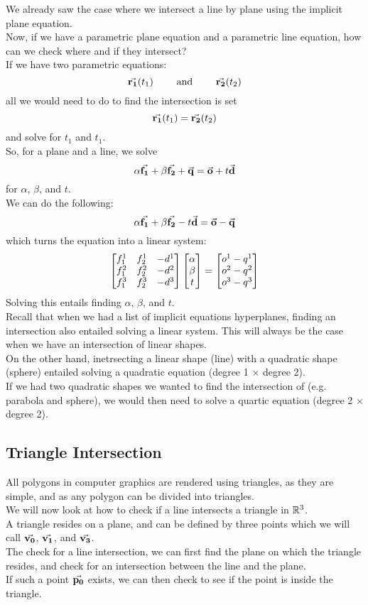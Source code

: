\documentclass[12pt]{article}
\begin{document}
We already saw the case where we intersect
a line by plane using the implicit plane
equation. \\
Now, if we have a parametric plane equation
and a parametric line equation,
how can we check where and if they intersect? \\
If we have two parametric equations:
\[ \vec{\mathbf{r_1}}(t_1) \qquad \text{ and }
\qquad \vec{\mathbf{r_2}}(t_2) \]
all we would need to do to find the intersection
is set
\[ \vec{\mathbf{r_1}}(t_1) = \vec{\mathbf{r_2}}(t_2) \]
and solve for $t_1$ and $t_1$. \\
So, for a plane and a line, we solve
\[ \alpha \vec{\mathbf{f_1}} + \beta \vec{\mathbf{f_2}} + \vec{\mathbf{q}}
= \vec{\mathbf{o}} + t\vec{\mathbf{d}} \]
for $\alpha$, $\beta$, and $t$. \\
We can do the following:
\[ \alpha \vec{\mathbf{f_1}} + \beta \vec{\mathbf{f_2}} - t\vec{\mathbf{d}}
= \vec{\mathbf{o}} - \vec{\mathbf{q}} \]
which turns the equation into a linear system:
\[ 
    \begin{bmatrix} f_1^1 & f_2^1 & -d^1 \\ f_1^2  & f_2^2 & -d^2 \\ f_1^3 & f_2^3 & -d^3 \end{bmatrix}
    \begin{bmatrix} \alpha \\ \beta \\ t \end{bmatrix}
    = \begin{bmatrix} o^1 - q^1 \\ o^2 - q^2 \\ o^3 - q^3 \end{bmatrix} 
\]
Solving this entails finding
$\alpha$, $\beta$, and $t$. \\

Recall that when we had a list of implicit equations
hyperplanes,
finding an intersection also entailed
solving a linear system.
This will always be the case when we have
an intersection of linear shapes. \\
On the other hand, inetrsecting a linear shape
(line) with a quadratic shape (sphere)
entailed solving a quadratic equation
(degree 1 $\times$ degree 2). \\
If we had two quadratic shapes we wanted to 
find the intersection of (e.g. parabola and sphere),
we would then need to solve a quartic equation
(degree 2 $\times$ degree 2). \\

\newpage

\subsection*{Triangle Intersection}

All polygons in computer graphics are
rendered using triangles,
as they are simple,
and as any polygon can be divided into triangles. \\

We will now look at how to check if a line
intersects a triangle in $\mathbb{R}^3$. \\

A triangle resides on a plane,
and can be defined by three points
which we will call $\vec{\mathbf{v_0}}$, $\vec{\mathbf{v_1}}$,
and $\vec{\mathbf{v_3}}$. \\
The check for a line intersection,
we can first find the plane on which the triangle
resides,
and check for an intersection between the line
and the plane. \\
If such a point $\vec{\mathbf{p_0}}$ exists,
we can then check to see if the point is
inside the triangle. \\
\end{document}
